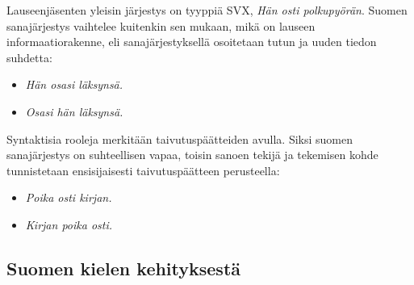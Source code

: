 \begin{multicols}{2}
Lauseenjäsenten yleisin järjestys on tyyppiä SVX, \textit{Hän osti polkupyörän}. Suomen
sanajärjestys vaihtelee kuitenkin sen mukaan, mikä on lauseen
informaatiorakenne, eli sanajärjestyksellä osoitetaan tutun ja uuden tiedon
suhdetta:
\begin{itemize}
\item \textit{Hän osasi läksynsä.}

\item \textit{Osasi hän läksynsä.}
\end{itemize}

Syntaktisia rooleja merkitään taivutuspäätteiden avulla. Siksi suomen
sanajärjestys on suhteellisen vapaa, toisin sanoen tekijä ja tekemisen kohde
tunnistetaan ensisijaisesti taivutuspäätteen perusteella:
\begin{itemize}
\item \textit{Poika osti kirjan.}

\item \textit{Kirjan poika osti.}
\end{itemize}



\subsection{Suomen kielen kehityksestä}



\end{multicols}
